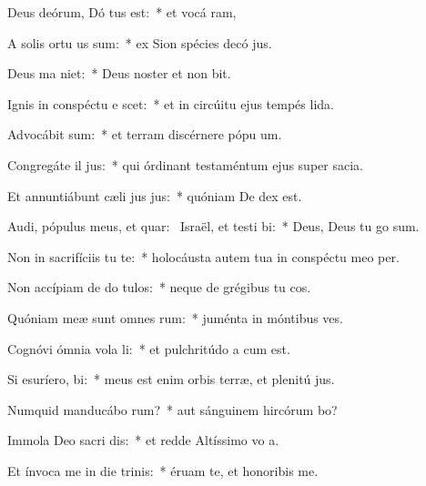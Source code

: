 \item Deus deórum, Dó tus est:~* et vocá ram,
\item A solis ortu us  sum:~* ex Sion spécies decó jus.
\item Deus ma niet:~* Deus noster et non bit.
\item Ignis in conspéctu e scet:~* et in circúitu ejus tempés lida.
\item Advocábit  sum:~* et terram discérnere pópu um.
\item Congregáte il  jus:~* qui órdinant testaméntum ejus super sacia.
\item Et annuntiábunt cæli jus jus:~* quóniam De dex est.
\item Audi, pópulus meus, et quar:~\pscross{} Israël, et testi bi:~* Deus, Deus tu go sum.
\item Non in sacrifíciis tu  te:~* holocáusta autem tua in conspéctu meo  per.
\item Non accípiam de do  tulos:~* neque de grégibus tu cos.
\item Quóniam meæ sunt omnes  rum:~* juménta in móntibus  ves.
\item Cognóvi ómnia vola li:~* et pulchritúdo a cum est.
\item Si esuríero,   bi:~* meus est enim orbis terræ, et plenitú jus.
\item Numquid manducábo  rum?~* aut sánguinem hircórum bo?
\item Immola Deo sacri dis:~* et redde Altíssimo vo a.
\item Et ínvoca me in die trinis:~* éruam te, et honoribis me.
